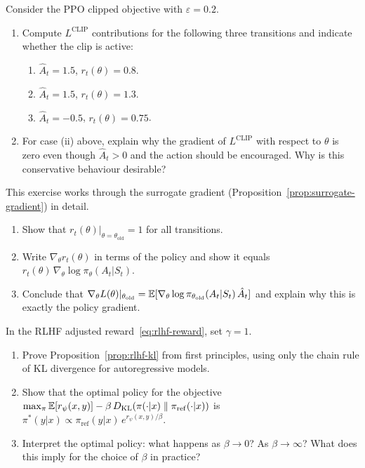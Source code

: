 \begin{exercise}
\label{ex:ppo-clip-numerical}
Consider the PPO clipped objective with $\varepsilon = 0.2$.
\begin{enumerate}[label=(\alph*)]
  \item Compute $L^{\mathrm{CLIP}}$ contributions for the following
    three transitions and indicate whether the clip is active:
    \begin{enumerate}[label=(\roman*)]
      \item $\hat{A}_t = 1.5$, $r_t(\theta) = 0.8$.
      \item $\hat{A}_t = 1.5$, $r_t(\theta) = 1.3$.
      \item $\hat{A}_t = -0.5$, $r_t(\theta) = 0.75$.
    \end{enumerate}
  \item For case (ii) above, explain why the gradient of
    $L^{\mathrm{CLIP}}$ with respect to $\theta$ is zero even though
    $\hat{A}_t > 0$ and the action should be encouraged.
    Why is this conservative behaviour desirable?
\end{enumerate}
\end{exercise}

\begin{exercise}
\label{ex:surrogate-gradient-proof}
This exercise works through the surrogate gradient
(Proposition~\ref{prop:surrogate-gradient}) in detail.
\begin{enumerate}[label=(\alph*)]
  \item Show that $r_t(\theta)|_{\theta=\theta_\mathrm{old}} = 1$ for all
    transitions.
  \item Write $\nabla_\theta r_t(\theta)$ in terms of the policy and
    show it equals $r_t(\theta)\,\nabla_\theta \log\pi_\theta(A_t|S_t)$.
  \item Conclude that $\nabla_\theta L(\theta)|_{\theta_\mathrm{old}}
    = \operatorname{\mathbb{E}}[\nabla_\theta\log\pi_{\theta_\mathrm{old}}(A_t|S_t)\,\hat{A}_t]$
    and explain why this is exactly the policy gradient.
\end{enumerate}
\end{exercise}

\begin{exercise}
\label{ex:rlhf-kl}
In the RLHF adjusted reward~\eqref{eq:rlhf-reward}, set $\gamma = 1$.
\begin{enumerate}[label=(\alph*)]
  \item Prove Proposition~\ref{prop:rlhf-kl} from first principles,
    using only the chain rule of KL divergence for autoregressive models.
  \item Show that the optimal policy for the objective
    $\max_\pi \operatorname{\mathbb{E}}[r_\psi(x,y)] - \beta\,D_{\mathrm{KL}}\!\left(\pi(\cdot|x)\;\|\;\pi_{\mathrm{ref}}(\cdot|x)\right)$
    is $\pi^*(y|x) \propto \pi_{\mathrm{ref}}(y|x)\,e^{r_\psi(x,y)/\beta}$.
  \item Interpret the optimal policy: what happens as $\beta \to 0$?
    As $\beta \to \infty$?  What does this imply for the choice of $\beta$
    in practice?
\end{enumerate}
\end{exercise}

